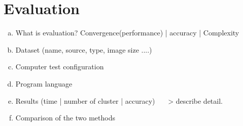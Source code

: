 \section{Evaluation}

\begin{enumerate}[(a) ]
\item What is evaluation? Convergence(performance) | accuracy | Complexity
\item Dataset (name, source, type, image size ....)
\item Computer test configuration
\item Program language
\item Results (time | number of cluster | accuracy) ~~~> describe detail.
\item Comparison of the two methods
\end{enumerate}